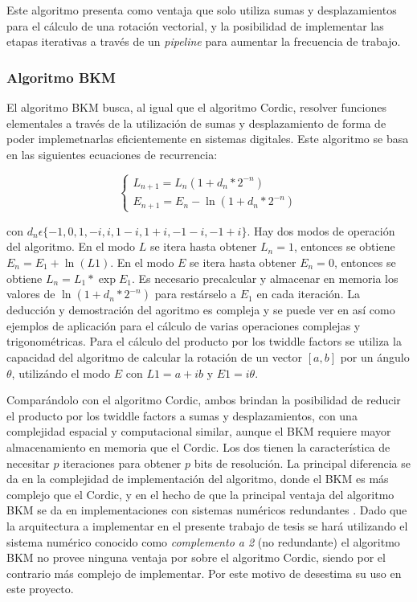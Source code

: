Este algoritmo presenta como ventaja que solo utiliza sumas y desplazamientos para el cálculo de una
rotación vectorial, y la posibilidad de implementar las
etapas iterativas a través de un \textit{pipeline} para aumentar la frecuencia de trabajo. 

\subsubsection{Algoritmo BKM}

El algoritmo BKM busca, al igual que el algoritmo Cordic, resolver funciones elementales a través de
la utilización de sumas y desplazamiento de forma de poder implemetnarlas eficientemente en sistemas
digitales.
Este algoritmo se basa en las siguientes ecuaciones de recurrencia:

\begin{equation}
	\begin{cases}
	L_{n+1} = L_n(1+d_n*2^{-n}) \\
	E_{n+1} = E_n - \ln (1+d_n*2^{-n})
	\end{cases}
\label{eq:BKM}
\end{equation}

con $d_n \epsilon \{-1,0,1,-i,i,1-i,1+i,-1-i,-1+i\}$. 
Hay dos modos de operación del algoritmo. En el modo $L$ se itera hasta obtener $L_n=1$, entonces se
obtiene $E_n=E_1+\ln (L1)$. En el modo $E$ se itera hasta obtener $E_n=0$, entonces se obtiene
$L_n=L_1*\exp{E_1}$.
Es necesario precalcular y almacenar en memoria los valores de $\ln(1+d_n*2^{-n})$ para restárselo a
$E_1$ en cada iteración. La deducción y demostración del agoritmo es compleja y se puede ver en
\cite{BKM} así como ejemplos de aplicación para el cálculo de varias operaciones complejas y trigonométricas.
Para el cálculo del producto por los twiddle factors se utiliza la capacidad del algoritmo de
calcular la rotación de un vector $[a,b]$ por un ángulo $\theta$, utilizándo el modo $E$ con
$L1=a+ib$ y $E1=i\theta$.

Comparándolo con el algoritmo Cordic, ambos brindan la posibilidad de reducir el producto por los
twiddle factors a sumas y desplazamientos, con una complejidad espacial y computacional similar,
aunque el BKM requiere mayor almacenamiento en memoria que el Cordic. Los dos tienen la
característica de necesitar $p$ iteraciones para obtener $p$ bits de resolución. La principal
diferencia se da en la complejidad de implementación del algoritmo, donde el BKM es más complejo que
el Cordic, y en el hecho de que la principal ventaja del algoritmo BKM se da en implementaciones con
sistemas numéricos redundantes \cite{BKM}. Dado que la arquitectura a implementar en el presente
trabajo de tesis se hará utilizando el sistema numérico conocido como \textit{complemento a 2} (no
redundante) el algoritmo BKM no provee ninguna ventaja por sobre el algoritmo Cordic, siendo por el
contrario más complejo de implementar. Por este motivo de desestima su uso en este proyecto.

